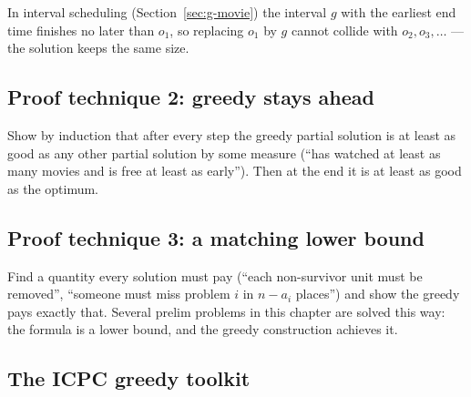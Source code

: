 \noindent In interval scheduling (Section~\ref{sec:g-movie}) the interval
$g$ with the earliest end time finishes no later than $o_1$, so replacing
$o_1$ by $g$ cannot collide with $o_2, o_3, \dots$ --- the solution keeps
the same size.

\subsection*{Proof technique 2: greedy stays ahead}

Show by induction that after every step the greedy partial solution is at
least as good as any other partial solution by some measure (``has watched
at least as many movies and is free at least as early''). Then at the end it
is at least as good as the optimum.

\subsection*{Proof technique 3: a matching lower bound}

Find a quantity every solution must pay (``each non-survivor unit must be
removed'', ``someone must miss problem $i$ in $n-a_i$ places'') and show
the greedy pays exactly that. Several prelim problems in this chapter are
solved this way: the formula is a lower bound, and the greedy construction
achieves it.

\subsection*{The ICPC greedy toolkit}

